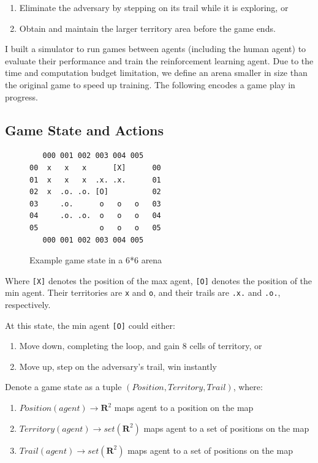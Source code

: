 \documentclass{article}
\begin{document}
\begin{enumerate}[label=-]
    \item Eliminate the adversary by stepping on its trail while it is exploring, or
    \item Obtain and maintain the larger territory area before the game ends.
\end{enumerate}

I built a simulator to run games between agents (including the human agent) to evaluate their performance and train the reinforcement learning agent. Due to the time and computation budget limitation, we define an arena smaller in size than the original game to speed up training. The following encodes a game play in progress.

\subsection{Game State and Actions}

\begin{figure}[h!]
\centering
\begin{BVerbatim}
   000 001 002 003 004 005
00  x   x   x      [X]      00
01  x   x   x  .x. .x.      01
02  x  .o. .o. [O]          02
03     .o.      o   o   o   03
04     .o. .o.  o   o   o   04
05              o   o   o   05
   000 001 002 003 004 005
\end{BVerbatim}
\caption{Example game state in a 6*6 arena}
\end{figure}

Where \texttt{[X]} denotes the position of the max agent, \texttt{[O]} denotes the position of the min agent. Their territories are \texttt{x} and \texttt{o}, and their trails are \texttt{.x.} and \texttt{.o.}, respectively.

At this state, the min agent \texttt{[O]} could either:

\begin{enumerate}[label=-]
    \item Move down, completing the loop, and gain 8 cells of territory, or
    \item Move up, step on the adversary's trail, win instantly
\end{enumerate}

Denote a game state as a tuple $(Position, Territory, Trail)$, where:
\begin{enumerate}[label=-]
    \item $Position(agent) \rightarrow \mathbf{R}^2$ maps agent to a position on the map
    \item $Territory(agent) \rightarrow set(\mathbf{R}^2)$ maps agent to a set of positions on the map
    \item $Trail(agent) \rightarrow set(\mathbf{R}^2)$ maps agent to a set of positions on the map
\end{enumerate}
\end{document}
